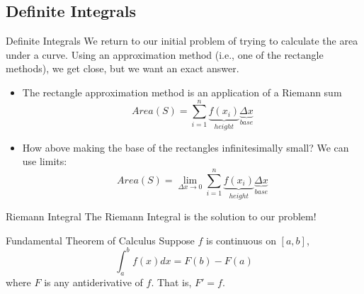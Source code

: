 \documentclass[]{beamer}
\begin{document}
\subsection{Definite Integrals}
    \begin{frame}{Definite Integrals}
        We return to our initial problem of trying to calculate the area under a curve. Using an approximation method (i.e., one of the rectangle methods), we get close, but we want an exact answer.
        \begin{itemize}
            \item<2-> The rectangle approximation method is an application of a Riemann sum
                $$ Area(S) = \sum_{i=1}^n \underbrace{f(x_i)}_{height} \underbrace{\Delta x}_{base}$$
            \item<3-> How above making the base of the rectangles infinitesimally small? We can use limits:
                $$ Area(S) = \lim_{\Delta x\rightarrow 0} \sum_{i=1}^n \underbrace{f(x_i)}_{height} \underbrace{\Delta x}_{base}$$
        \end{itemize}
    \end{frame}

    \begin{frame}{Riemann Integral}
        The Riemann Integral is the solution to our problem!
    \end{frame}

    \begin{frame}{Fundamental Theorem of Calculus}
        Suppose $f$ is continuous on $[a,b]$,
            $$\int_a^b f(x) dx = F(b) - F(a)$$
        where $F$ is any antiderivative of $f$. That is, $F' = f$. 

    \end{frame}
\end{document}
